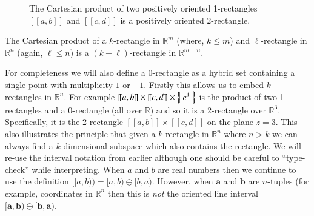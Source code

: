 \begin{figure}[h]
\caption[Cartesian product of two 1-rectangles]{The Cartesian product of two positively oriented 1-rectangles $[\![a,b]\!]$ and $[\![c,d]\!]$ is a positively oriented 2-rectangle.}
\centering
{}
\end{figure}

\begin{theorem}
	The Cartesian product of a $k$-rectangle in $\mathbb{R}^m$ (where, $k\leq m$) 
	and $\ell$-rectangle in $\mathbb{R}^n$ (again, $\ell \leq n$) 
	is a $(k+\ell)$-rectangle in $\mathbb{R}^{m+n}$.
\end{theorem}

For completeness we will also define a 0-rectangle as a hybrid set containing a single point with multiplicity $1$ or $-1$.
Firstly this allows us to embed $k$-rectangles in $\mathbb{R}^n$.
For example $[\![a,b]\!] \times [\![c,d]\!] \times \left\{ \! \left| \; e^1 \; \right| \! \right\}$ is the product of two 1-rectangles and a 0-rectangle (all over $\mathbb{R}$) and so it is a 2-rectangle over $\mathbb{R}^3$.
Specifically, it is the 2-rectangle $[\![a,b]\!] \times [\![c,d]\!]$ on the plane $z=3$.
This also illustrates the principle that given a $k$-rectangle in $\mathbb{R}^n$ where $n>k$ we can always find a $k$ dimensional subspace which also contains the rectangle.
We will re-use the interval notation from earlier although one should be careful to ``type-check'' while interpreting.
When $a$ and $b$ are real numbers then we continue to use the definition $[\![a,b)\!) = [a,b) \ominus [b,a)$.
However, when $\boldsymbol{a}$ and $\boldsymbol{b}$ are $n$-tuples (for example, coordinates in $\mathbb{R}^n$ then this is \emph{not} the oriented line interval $[\boldsymbol{a}, \boldsymbol{b}) \ominus [\boldsymbol{b}, \boldsymbol{a})$.

